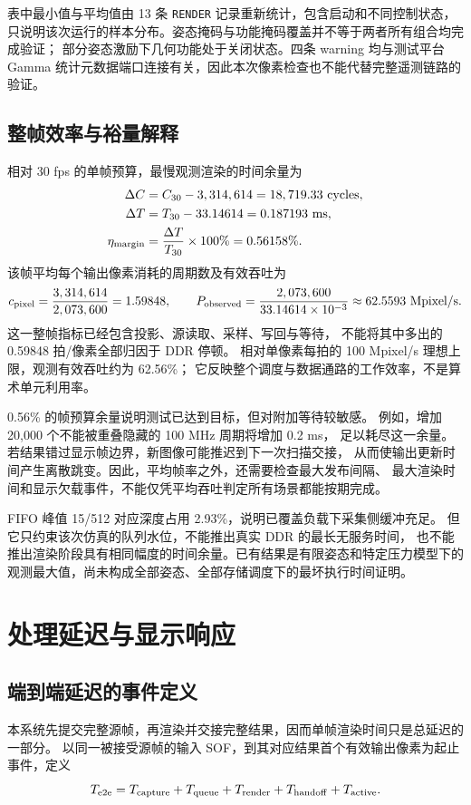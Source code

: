 表中最小值与平均值由 13 条 \texttt{RENDER} 记录重新统计，包含启动和不同控制状态，
只说明该次运行的样本分布。姿态掩码与功能掩码覆盖并不等于两者所有组合均完成验证；
部分姿态激励下几何功能处于关闭状态。四条 warning 均与测试平台 Gamma
统计元数据端口连接有关，因此本次像素检查也不能代替完整遥测链路的验证。
\begingroup{}
\endgroup

\subsection{整帧效率与裕量解释}
相对 30 fps 的单帧预算，最慢观测渲染的时间余量为
\begin{align}
\Delta C&=C_{30}-3,314,614=18,719.33\ \text{cycles},\\
\Delta T&=T_{30}-33.14614=0.187193\ \text{ms},\\
\eta_{\rm margin}&=\frac{\Delta T}{T_{30}}\times100\%=0.56158\%.
\end{align}
该帧平均每个输出像素消耗的周期数及有效吞吐为
\begin{equation}
c_{\rm pixel}=\frac{3,314,614}{2,073,600}=1.59848,
\qquad
P_{\rm observed}=\frac{2,073,600}{33.14614\times10^{-3}}
\approx62.5593\ \text{Mpixel/s}.
\end{equation}
这一整帧指标已经包含投影、源读取、采样、写回与等待，
不能将其中多出的 0.59848 拍/像素全部归因于 DDR 停顿。
相对单像素每拍的 100 Mpixel/s 理想上限，观测有效吞吐约为 62.56\%；
它反映整个调度与数据通路的工作效率，不是算术单元利用率。

0.56\% 的帧预算余量说明测试已达到目标，但对附加等待较敏感。
例如，增加 20,000 个不能被重叠隐藏的 100 MHz 周期将增加 0.2 ms，
足以耗尽这一余量。若结果错过显示帧边界，新图像可能推迟到下一次扫描交接，
从而使输出更新时间产生离散跳变。因此，平均帧率之外，还需要检查最大发布间隔、
最大渲染时间和显示欠载事件，不能仅凭平均吞吐判定所有场景都能按期完成。

FIFO 峰值 15/512 对应深度占用 2.93\%，说明已覆盖负载下采集侧缓冲充足。
但它只约束该次仿真的队列水位，不能推出真实 DDR 的最长无服务时间，
也不能推出渲染阶段具有相同幅度的时间余量。已有结果是有限姿态和特定压力模型下的
观测最大值，尚未构成全部姿态、全部存储调度下的最坏执行时间证明。

\section{处理延迟与显示响应}
\subsection{端到端延迟的事件定义}
本系统先提交完整源帧，再渲染并交接完整结果，因而单帧渲染时间只是总延迟的一部分。
以同一被接受源帧的输入 SOF，到其对应结果首个有效输出像素为起止事件，定义
\begin{equation}
T_{\rm e2e}=T_{\rm capture}+T_{\rm queue}+T_{\rm render}
+T_{\rm handoff}+T_{\rm active}.
\label{eq:rt-latency}
\end{equation}

